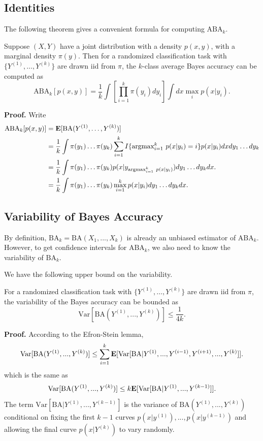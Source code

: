 \subsection{Identities}

The following theorem gives a convenient formula for computing $\text{ABA}_k$.

\begin{theorem}
Suppose $(X, Y)$ have a joint distribution with a density $p(x,y)$, with a marginal density $\pi(y)$.
Then for a randomized classification task with $\{Y^{(1)},\hdots,
Y^{(k)}\}$ are drawn iid from $\pi$, the $k$-class average Bayes
accuracy can be computed as
\[
\text{ABA}_k[p(x,y)] = \frac{1}{k} \int \left[\prod_{i=1}^k \pi(y_i) dy_i \right] \int dx \max_i p(x|y_i).
\]
\end{theorem}

\noindent\textbf{Proof.}
Write
\begin{align*}
\text{ABA}_k[p(x, y)] &=  \textbf{E}[\text{BA}(Y^{(1)},\hdots, Y^{(k)})]
\\&= \frac{1}{k}\int \pi(y_1)\hdots \pi(y_k)   \sum_{i=1}^k  I\{\text{argmax}_{i=1}^k\ p(x|y_i) = i\} p(x|y_i) dx dy_1\hdots dy_k
\\&=  \frac{1}{k} \int \pi(y_1)\hdots \pi(y_k) p(x|y_{\text{argmax}_{i=1}^k\ p(x|y_i)})  dy_1\hdots dy_k dx.
\\&=  \frac{1}{k} \int \pi(y_1)\hdots \pi(y_k) \max_{i=1}^k p(x|y_i)  dy_1\hdots dy_k dx.
\end{align*}

\subsection{Variability of Bayes Accuracy}\label{sec:variability_aba}

By definition, $\text{BA}_k = \text{BA}(X_1,...,X_k)$ is already an
unbiased estimator of $\text{ABA}_k$.  However, to get confidence
intervals for $\text{ABA}_k$, we also need to know the variability of
$\text{BA}_k$.

We have the following upper bound on the variability.

\begin{theorem}\label{thm:aba_var}
For a randomized classification task with $\{Y^{(1)},\hdots,
Y^{(k)}\}$ are drawn iid from $\pi$, the variability of the Bayes
accuracy can be bounded as
\[
\text{Var}[\text{BA}(Y^{(1)},...,Y^{(k)})] \leq \frac{1}{4k}.
\]
\end{theorem}

\noindent\textbf{Proof.}
According to the Efron-Stein lemma,
\[
\text{Var}[\text{BA}(Y^{(1)},...,Y^{(k)})] \leq \sum_{i=1}^k \textbf{E}[\text{Var}[\text{BA}|Y^{(1)},...,Y^{(i-1)}, Y^{(i+1)}, ..., Y^{(k)}]].
\]
which is the same as
\[
\text{Var}[\text{BA}(Y^{(1)},...,Y^{(k)})] \leq k \textbf{E}[\text{Var}[\text{BA}|Y^{(1)},...,Y^{(k-1)}]].
\]
The term $\text{Var}[\text{BA}|Y^{(1)},...,Y^{(k-1)}]$ is the variance
of $\text{BA}(Y^{(1)},...,Y^{(k)})$ conditional on fixing the first
$k-1$ curves $p(x|y^{(1)}),...,p(x|y^{(k-1)})$ and allowing the final
curve $p(x|Y^{(k)})$ to vary randomly.

